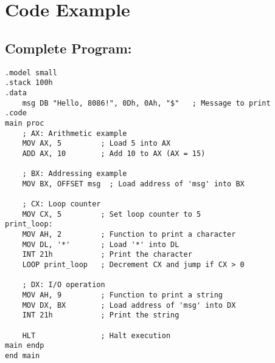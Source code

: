 \documentclass[a4paper,12pt]{article}
\begin{document}
\section*{Code Example}

\subsection*{Complete Program:}
\begin{verbatim}
.model small
.stack 100h
.data
    msg DB "Hello, 8086!", 0Dh, 0Ah, "$"   ; Message to print
.code
main proc
    ; AX: Arithmetic example
    MOV AX, 5         ; Load 5 into AX
    ADD AX, 10        ; Add 10 to AX (AX = 15)

    ; BX: Addressing example
    MOV BX, OFFSET msg  ; Load address of 'msg' into BX

    ; CX: Loop counter
    MOV CX, 5         ; Set loop counter to 5
print_loop:
    MOV AH, 2         ; Function to print a character
    MOV DL, '*'       ; Load '*' into DL
    INT 21h           ; Print the character
    LOOP print_loop   ; Decrement CX and jump if CX > 0

    ; DX: I/O operation
    MOV AH, 9         ; Function to print a string
    MOV DX, BX        ; Load address of 'msg' into DX
    INT 21h           ; Print the string

    HLT               ; Halt execution
main endp
end main
\end{verbatim}
\end{document}
